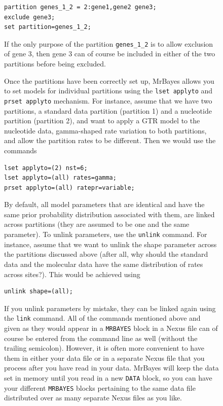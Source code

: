 \documentclass[12pt]{book}
\newcommand{\ttt}[1]{\texttt{#1}}
\begin{document}
\begin{figure}[h]
\begin{singlespacing}
\small
\begin{verbatim}
partition genes_1_2 = 2:gene1,gene2 gene3;
exclude gene3;
set partition=genes_1_2;
\end{verbatim}
\normalsize
\end{singlespacing}

If the only purpose of the partition \ttt{genes\_1\_2} is to allow exclusion of gene 3, then gene 3
can of course be included in either of the two partitions before being excluded.

Once the partitions have been correctly set up, MrBayes allows you to set models for individual
partitions using the \ttt{lset applyto} and \ttt{prset applyto} mechanism. For instance, assume
that we have two partitions, a standard data partition (partition 1) and a nucleotide partition
(partition 2), and want to apply a GTR model to the nucleotide data, gamma-shaped rate variation to
both partitions, and allow the partition rates to be different. Then we would use the commands

\begin{singlespacing}
\small
\begin{verbatim}
lset applyto=(2) nst=6;
lset applyto=(all) rates=gamma;
prset applyto=(all) ratepr=variable;
\end{verbatim}
\normalsize
\end{singlespacing}

By default, all model parameters that are identical and have the same prior probability
distribution associated with them, are linked across partitions (they are assumed to be one and the
same parameter). To unlink parameters, use the \ttt{unlink} command. For instance, assume that we
want to unlink the shape parameter across the partitions discussed above (after all, why should the
standard data and the molecular data have the same distribution of rates across sites?). This would
be achieved using

\begin{singlespacing}
\small
\begin{verbatim}
unlink shape=(all);
\end{verbatim}
\normalsize
\end{singlespacing}

If you unlink parameters by mistake, they can be linked again using the \ttt{link} command. All of
the commands mentioned above and given as they would appear in a \ttt{MRBAYES} block in a Nexus
file can of course be entered from the command line as well (without the trailing semicolon).
However, it is often more convenient to have them in either your data file or in a separate Nexus
file that you process after you have read in your data. MrBayes will keep the data set in memory
until you read in a new \ttt{DATA} block, so you can have your different \ttt{MRBAYES} blocks
pertaining to the same data file distributed over as many separate Nexus files as you like.


\end{figure}
\end{document}
